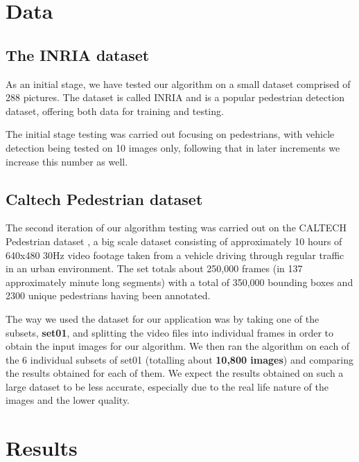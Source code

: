 \documentclass[runningheads,a4paper,11pt]{report}
\begin{document}
\section{Data}
\label{section:data}


\subsection{The INRIA dataset}

As an initial stage, we have tested our algorithm on a small dataset comprised of 288 pictures. The dataset is called INRIA \cite{INRIAPer30:online} and is a popular pedestrian detection dataset, offering both data for training and testing. 

The initial stage testing was carried out focusing on pedestrians, with vehicle detection being tested on 10 images only, following that in later increments we increase this number as well. 

\subsection{Caltech Pedestrian dataset}

The second iteration of our algorithm testing was carried out on the CALTECH Pedestrian dataset \cite{CaltechP42:online}, a big scale dataset consisting of approximately 10 hours of 640x480 30Hz video footage taken from a vehicle driving through regular traffic in an urban environment. The set totals about 250,000 frames (in 137 approximately minute long segments) with a total of 350,000 bounding boxes and 2300 unique pedestrians having been annotated.

The way we used the dataset for our application was by taking one of the subsets, \textbf{set01}, and splitting the video files into individual frames in order to obtain the input images for our algorithm. We then ran the algorithm on each of the 6 individual subsets of set01 (totalling about \textbf{10,800 images}) and comparing the results obtained for each of them. We expect the results obtained on such a large dataset to be less accurate, especially due to the real life nature of the images and the lower quality.

\section{Results}
\label{section:results}

\end{document}

